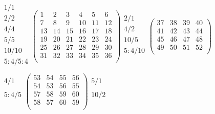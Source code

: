 \documentclass[12pt,a4paper]{amsart}
\begin{document}
\begin{align*}
\begin{array}{r}%
1/1 \\%
2/2\\%
4/4\\%
5/5\\%
10/10\\%
5:4/5:4\\%
\end{array}%
\left(\begin{array}{r|r|r|r|r|r}%
1&2&3&4&5&6\\\hline%
7&8&9&10&11&12\\\hline%
13&14&15&16&17&18\\\hline%
19&20&21&22&23&24\\\hline%
25&26&27&28&29&30\\\hline%
31&32&33&34&35&36\\%
\end{array}\right)%
\begin{array}{r}%
2/1 \\%
4/2\\%
10/5\\%
5:4/10\\%
\end{array}%
\left(\begin{array}{r|r|r|r}%
37&38&39&40\\\hline%
41&42&43&44\\\hline%
45&46&47&48\\\hline%
49&50&51&52\\%
\end{array}\right)%
\\
\begin{array}{r}%
4/1 \\%
\\%
5:4/5\\%
\\%
\end{array}%
\left(\begin{array}{rr|rr}%
53&54&55&56\\%
54&53&56&55\\\hline%
57&58&59&60\\%
58&57&60&59\\%
\end{array}\right)%
\begin{array}{r}%
5/1\\%
\\%
10/2\\%
\\%
\end{array}%

\end{align*}
\end{document}
